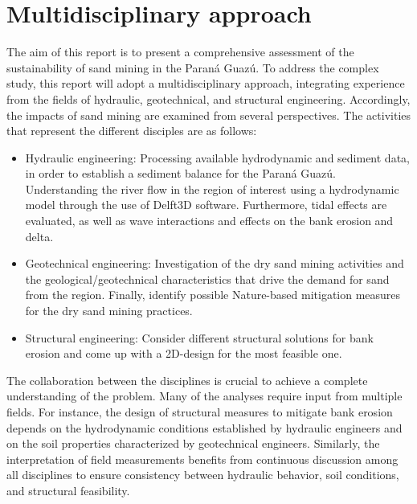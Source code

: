 \section{Multidisciplinary approach}
The aim of this report is to present a comprehensive assessment of the sustainability of sand mining in the Paraná Guazú. To address the complex study, this report will adopt a multidisciplinary approach, integrating experience from the fields of hydraulic, geotechnical, and structural engineering.
Accordingly, the impacts of sand mining are examined from several perspectives. The activities that represent the different disciples are as follows:

\begin{itemize}
    \item Hydraulic engineering: 
    Processing available hydrodynamic and sediment data, in order to establish a sediment balance for the Paraná Guazú.
    Understanding the river flow in the region of interest using a hydrodynamic model through the use of Delft3D software. Furthermore, tidal effects are evaluated, as well as wave interactions and effects on the bank erosion and delta. 
    
    \item Geotechnical engineering: 
    Investigation of the dry sand mining activities and the geological/geotechnical characteristics that drive the demand for sand from the region. Finally, identify possible Nature-based mitigation measures for the dry sand mining practices.
    
    \item Structural engineering: Consider different structural solutions for bank erosion and come up with a 2D-design for the most feasible one.
\end{itemize}

The collaboration between the disciplines is crucial to achieve a complete understanding of the problem. Many of the analyses require input from multiple fields. For instance, the design of structural measures to mitigate bank erosion depends on the hydrodynamic conditions established by hydraulic engineers and on the soil properties characterized by geotechnical engineers. Similarly, the interpretation of field measurements benefits from continuous discussion among all disciplines to ensure consistency between hydraulic behavior, soil conditions, and structural feasibility.


